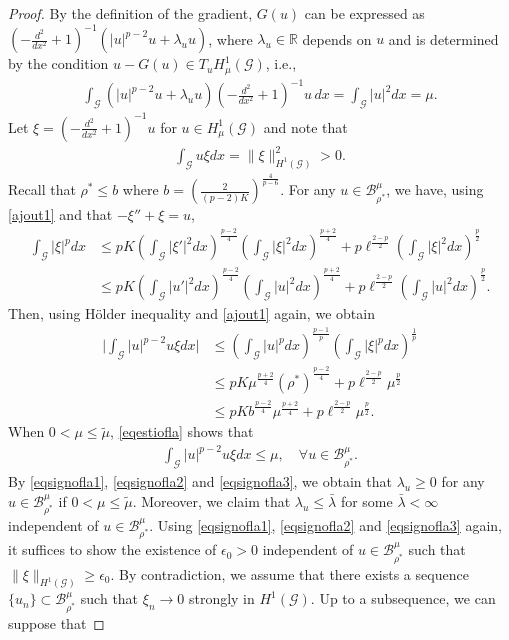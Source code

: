 \documentclass[10pt,a4paper]{article}
\theoremstyle{definition} \theoremstyle{remark}
\numberwithin{equation}{section}
\newcommand{\G}{\mathcal{G}}
\newcommand{\R}{\mathbb{R}}
\newcommand{\B}{\mathcal{B}}
\newcommand{\la}{\lambda}
\begin{document}
\begin{proof}
	By the definition of the gradient, $G(u)$ can be expressed as $(-\frac{d^2}{dx^2} + 1)^{-1}(|u|^{p-2}u + \la_uu)$, where $\la_u \in \R$ depends on $u$ and is determined by the condition $u - G(u) \in T_uH^1_\mu(\G)$, i.e.,
	\begin{align} \label{eqsignofla1}
		\int_{\G}(|u|^{p-2}u + \la_uu)(-\frac{d^2}{dx^2} + 1)^{-1}u \, dx = \int_{\G}|u|^2dx = \mu.
	\end{align}
    Let $\xi = (-\frac{d^2}{dx^2} + 1)^{-1}u$ for $u \in H^1_\mu(\G)$ and note that
    \begin{align} \label{eqsignofla2}
	\int_\G u\xi dx = \|\xi\|_{H^1(\G)}^2 > 0.
    \end{align}
	Recall that $\rho^* \leq b$ where $b = \left( \frac2{(p-2)K}\right)^{\frac4{p-6}}$. For any $u \in \B_{\rho^*}^\mu$, we have, using \eqref{ajout1}
	and that $-\xi'' + \xi =u$,
	\begin{align*}
		\int_\G |\xi|^pdx & \leq pK \left( \int_\G |\xi'|^2dx \right) ^{\frac{p-2}4} \left( \int_\G |\xi|^2dx \right)^{\frac{p+2}4} + p \ell^{\frac{2-p}2}\left( \int_\G |\xi|^2dx \right)^ {\frac p2} \nonumber\\
		& \leq pK \left( \int_\G |u'|^2dx \right) ^{\frac{p-2}4} \left( \int_\G |u|^2dx \right)^{\frac{p+2}4} + p \ell^{\frac{2-p}2}\left( \int_\G |u|^2dx \right)^ {\frac p2}.
	\end{align*}	
   Then, using H\"older inequality and \eqref{ajout1} again, we obtain
	\begin{align} \label{eqestiofla}
		\bigg|\int_\G|u|^{p-2}u\xi dx\bigg| & \leq \left( \int_\G|u|^pdx \right)^{\frac{p-1}p} \left( \int_\G|\xi|^pdx \right)^{\frac{1}p} \nonumber \\
		& \le pK\mu^{\frac{p+2}4}(\rho^*)^{\frac{p-2}4} + p\ell^{\frac{2-p}2}\mu^{\frac p2} \nonumber \\
		& \leq  pKb^{\frac{p-2}4}\mu^{\frac{p+2}4} +  p\ell^{\frac{2-p}2}\mu^{\frac p2}.
	\end{align} 
    When $0 < \mu \leq \tilde{\mu}$, \eqref{eqestiofla} shows that
    \begin{align} \label{eqsignofla3}
    	\int_\G|u|^{p-2}u\xi dx \leq \mu, \quad \forall u \in \B_{\rho^*}^\mu.
    \end{align}
	By \eqref{eqsignofla1}, \eqref{eqsignofla2} and \eqref{eqsignofla3}, we obtain that  $\la_u \ge 0$ for any $u \in \B_{\rho^*}^\mu$ if $0 < \mu \leq \tilde{\mu}$. Moreover, we claim that $\la_u \leq \bar \la$ for some $\bar \la < \infty$ independent of $u \in \B_{\rho^*}^\mu$. Using \eqref{eqsignofla1}, \eqref{eqsignofla2} and \eqref{eqsignofla3} again, it suffices to show the existence of  $\epsilon_0 > 0$ independent of $u \in \B_{\rho^*}^\mu$ such that $\|\xi\|_{H^1(\G)} \geq \epsilon_0$. By contradiction, we assume that there exists a sequence $\{u_n\} \subset \B_{\rho^*}^\mu$ such that $\xi_n \to 0$ strongly in $H^1(\G)$. Up to a subsequence, we can suppose that 

\end{proof}
\end{document}
